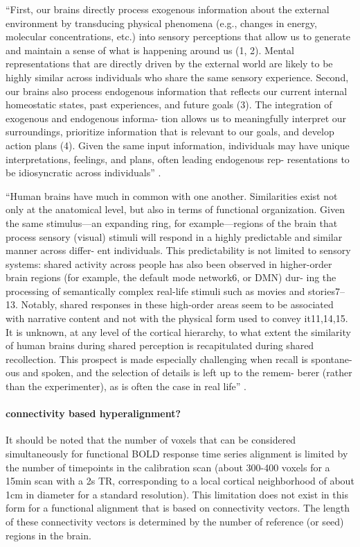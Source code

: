 ``First, our brains directly process exogenous information about the external
environment by transducing physical phenomena (e.g., changes in energy,
molecular concentrations, etc.) into sensory perceptions that allow us to
generate and maintain a sense of what is happening around us (1, 2). Mental
representations that are directly driven by the external world are likely to be
highly similar across individuals who share the same sensory experience. Second,
our brains also process endogenous information that reflects our current
internal homeostatic states, past experiences, and future goals (3). The
integration of exogenous and endogenous informa- tion allows us to meaningfully
interpret our surroundings, prioritize information that is relevant to our
goals, and develop action plans (4). Given the same input information,
individuals may have unique interpretations, feelings, and plans, often leading
endogenous rep- resentations to be idiosyncratic across individuals''
\citep{chang2021endogenous}.

``Human brains have much in common with one another. Similarities exist not only
at the anatomical level, but also in terms of functional organization. Given the
same stimulus—an expanding ring, for example—regions of the brain that process
sensory (visual) stimuli will respond in a highly predictable and similar manner
across differ- ent individuals. This predictability is not limited to sensory
systems: shared activity across people has also been observed in higher-order
brain regions (for example, the default mode network6, or DMN) dur- ing the
processing of semantically complex real-life stimuli such as movies and
stories7–13. Notably, shared responses in these high-order areas seem to be
associated with narrative content and not with the physical form used to convey
it11,14,15. It is unknown, at any level of the cortical hierarchy, to what
extent the similarity of human brains during shared perception is recapitulated
during shared recollection. This prospect is made especially challenging when
recall is spontane- ous and spoken, and the selection of details is left up to
the remem- berer (rather than the experimenter), as is often the case in real
life'' \citep{chen2017shared}.


\paragraph{connectivity based hyperalignment?}
%
It should be noted that the number of voxels that can be considered
simultaneously for functional BOLD response time series alignment is limited by
the number of timepoints in the calibration scan (about 300-400 voxels for a
15min scan with a 2s TR, corresponding to a local cortical neighborhood of about
1cm in diameter for a standard resolution).
%
This limitation does not exist in this form for a functional alignment that is
based on connectivity vectors.
%
The length of these connectivity vectors is determined by the number of
reference (or seed) regions in the brain.


